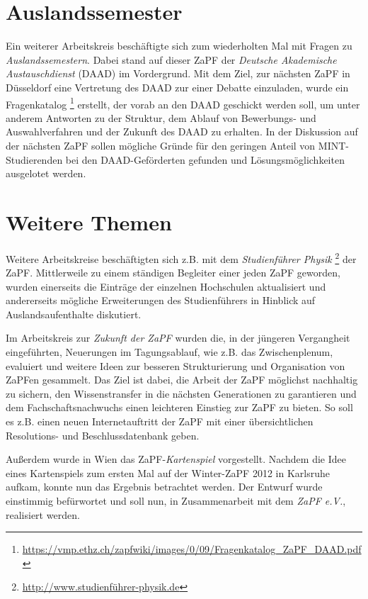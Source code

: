 \documentclass{scrartcl}
\begin{document}
\section*{Auslandssemester}
Ein weiterer Arbeitskreis besch\"aftigte sich zum wiederholten Mal mit Fragen zu \emph{Auslandssemestern}. Dabei stand auf dieser ZaPF der \emph{Deutsche Akademische Austauschdienst} (DAAD) im Vordergrund. Mit dem Ziel, zur n\"achsten ZaPF in D\"usseldorf eine Vertretung des DAAD zur einer Debatte einzuladen, wurde ein Fragenkatalog \footnote{\href{https://vmp.ethz.ch/zapfwiki/images/0/09/Fragenkatalog_ZaPF_DAAD.pdf}{\url{https://vmp.ethz.ch/zapfwiki/images/0/09/Fragenkatalog_ZaPF_DAAD.pdf}}} erstellt, der vorab an den DAAD geschickt werden soll, um unter anderem Antworten zu der Struktur, dem Ablauf von Bewerbungs- und Auswahlverfahren und der Zukunft des DAAD zu erhalten. In der Diskussion auf der n\"achsten ZaPF sollen m\"ogliche Gr\"unde f\"ur den geringen Anteil von MINT-Studierenden bei den DAAD-Gef\"orderten gefunden und L\"osungsm\"oglichkeiten ausgelotet werden.

\section*{Weitere Themen}
Weitere Arbeitskreise besch\"aftigten sich z.B. mit dem \emph{Studienf\"uhrer Physik} \footnote{\href{http://www.studienführer-physik.de}{\url{http://www.studienführer-physik.de}}} der ZaPF. Mittlerweile zu einem st\"andigen Begleiter einer jeden ZaPF geworden, wurden einerseits die Eintr\"age der einzelnen Hochschulen aktualisiert und andererseits m\"ogliche Erweiterungen des Studienf\"uhrers in Hinblick auf Auslandsaufenthalte diskutiert.

Im Arbeitskreis zur \emph{Zukunft der ZaPF} wurden die, in der j\"ungeren Vergangheit eingef\"uhrten, Neuerungen im Tagungsablauf, wie z.B. das Zwischenplenum, evaluiert und weitere Ideen zur besseren Strukturierung und Organisation von ZaPFen gesammelt. Das  Ziel ist dabei, die Arbeit der ZaPF m\"oglichst nachhaltig zu sichern, den Wissenstransfer in die n\"achsten Generationen zu garantieren und dem Fachschaftsnachwuchs einen leichteren Einstieg zur ZaPF zu bieten. So soll es z.B. einen neuen Internetauftritt der ZaPF mit einer \"ubersichtlichen Resolutions- und Beschlussdatenbank geben.

Au\ss erdem wurde in Wien das ZaPF-\emph{Kartenspiel} vorgestellt. Nachdem die Idee eines Kartenspiels zum ersten Mal auf der Winter-ZaPF 2012 in Karlsruhe aufkam, konnte nun das Ergebnis betrachtet werden. Der Entwurf wurde einstimmig bef\"urwortet und soll nun, in Zusammenarbeit mit dem \emph{ZaPF e.V.}, realisiert werden.
\end{document}
